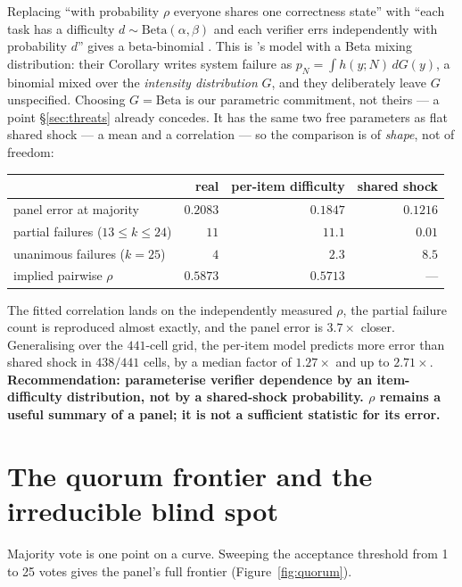 \documentclass[11pt,a4paper]{article}
\begin{document}
Replacing ``with probability $\rho$ everyone shares one correctness state'' with
``each task has a difficulty $d \sim \mathrm{Beta}(\alpha,\beta)$ and each
verifier errs independently with probability $d$'' gives a beta-binomial
\citep{williams1975}. This is \citet{eckhardt1985}'s model with a Beta mixing
distribution: their Corollary writes system failure as
$p_N = \int h(y;N)\,dG(y)$, a binomial mixed over the \emph{intensity
distribution} $G$, and they deliberately leave $G$ unspecified. Choosing
$G = \mathrm{Beta}$ is our parametric commitment, not theirs --- a point
\S\ref{sec:threats} already concedes. It has the same two free parameters as flat shared
shock --- a mean and a correlation --- so the comparison is of \emph{shape}, not
of freedom:

\begin{center}
\begin{tabular}{lrrr}
\toprule
 & real & per-item difficulty & shared shock \\
\midrule
panel error at majority & $0.2083$ & $0.1847$ & $0.1216$ \\
partial failures ($13 \le k \le 24$) & $11$ & $11.1$ & $\mathbf{0.01}$ \\
unanimous failures ($k = 25$) & $4$ & $2.3$ & $8.5$ \\
implied pairwise $\rho$ & $0.5873$ & $0.5713$ & --- \\
\bottomrule
\end{tabular}
\end{center}

The fitted correlation lands on the independently measured $\rho$, the partial
failure count is reproduced almost exactly, and the panel error is $3.7\times$
closer. Generalising over the $441$-cell grid, the per-item model predicts more
error than shared shock in $438/441$ cells, by a median factor of $1.27\times$ and
up to $2.71\times$. \textbf{Recommendation: parameterise verifier dependence by an
item-difficulty distribution, not by a shared-shock probability. $\rho$ remains a
useful summary of a panel; it is not a sufficient statistic for its error.}

\section{The quorum frontier and the irreducible blind spot}
\label{sec:quorum}

Majority vote is one point on a curve. Sweeping the acceptance threshold from 1
to 25 votes gives the panel's full frontier (Figure~\ref{fig:quorum}).
\end{document}
